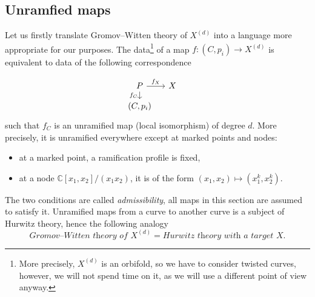 \documentclass[11pt, reqno]{amsart}
\theoremstyle{plain}
\theoremstyle{definition}
\theoremstyle{remark}
\newcommand{\BC}{{\mathbb{C}}}
\begin{document}
\subsection{Unramfied maps} Let us firstly translate Gromov--Witten theory of $X^{(d)}$ into a language more appropriate for our purposes. The data\footnote{More precisely, $X^{(d)}$ is an orbifold, so we have to consider twisted curves, however, we will not spend time on it, as we will use a  different point of view anyway. } of a map $f \colon (C,p_i) \rightarrow X^{(d)}$ is equivalent to data of the following correspondence

\[
\begin{tikzcd}[row sep=small, column sep = small]
	P \arrow[r, "f_{X}"] \arrow{d}[swap]{f_{C}} & X  & \\
	(C,p_i) & & 
\end{tikzcd}
\]
such that $f_C$ is an unramified map (local isomorphism) of degree $d$. More precisely, it is unramified everywhere except at marked points and nodes:
\begin{itemize} \item at a marked point, a ramification profile is fixed,
	\item  at a node $\BC[x_1,x_2]/(x_1x_2)$, it is of the form $(x_1,x_2) \mapsto (x^k_1,x_2^k)$.
	\end{itemize} 
The two  conditions are called  \textit{admissibility}, all maps in this section are assumed to satisfy it. Unramified maps from a curve to another curve is a subject of Hurwitz theory, hence the following analogy 
\[ \textit{Gromov--Witten theory of }X^{(d)} = \textit{Hurwitz theory with a target }X. \]
\end{document}
